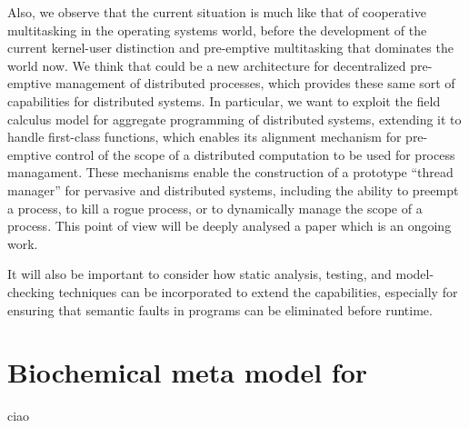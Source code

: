 \documentclass[12pt,a4paper,twoside,openright]{book}
\begin{document}
Also, we observe that the current situation is much like that of cooperative multitasking in the operating systems world, before the development of the current kernel-user distinction and pre-emptive multitasking that dominates the world now.
%
We think that \protelis{} could be a new architecture for decentralized pre-emptive management of distributed processes, which provides these same sort of capabilities for distributed systems.
%
In particular, we want to exploit the field calculus model for aggregate programming of distributed systems, extending it to handle first-class functions, which enables its alignment mechanism for pre-emptive control of the scope of a distributed computation to be used for process managament.
%
These mechanisms enable the construction of a prototype ``thread manager'' for pervasive and distributed systems, including the ability to preempt a process, to kill a rogue process, or to dynamically manage the scope of a process.
%
This point of view will be deeply analysed a paper which is an ongoing work.

It will also be important to consider how static analysis, testing, and model-checking techniques can be incorporated to extend the capabilities, especially for ensuring that semantic faults in programs can be eliminated before runtime.




\section{Biochemical meta model for \alchemist{}}
ciao

%
%
%

%

\small\protect\newpage{}



\listoffigures
\listoftables
\end{document}
